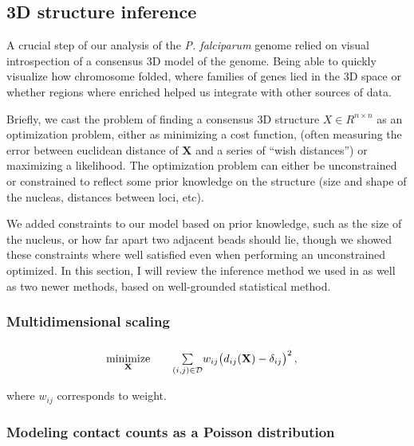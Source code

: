 \documentclass[oupdraft]{bio}
\begin{document}
\subsection{3D structure inference}

A crucial step of our analysis of the \textit{P. falciparum} genome relied on
visual introspection of a consensus 3D model of the genome. Being able to
quickly visualize how chromosome folded, where families of genes lied in the
3D space or whether regions where enriched helped us integrate with other
sources of data.

Briefly, we cast the problem of finding a consensus 3D structure $X \in R^{n
\times n}$ as an optimization problem, either as minimizing a cost function,
(often measuring the error between euclidean distance of $\mathbf{X}$ and a
series of ``wish distances'') or maximizing a likelihood. The optimization
problem can either be unconstrained or constrained to reflect some prior
knowledge on the structure (size and shape of the nucleas, distances between
loci, etc).

We added constraints to our model based on prior knowledge, such as the size
of the nucleus, or how far apart two adjacent beads should lie, though we
showed these constraints where well satisfied even when performing an
unconstrained optimized. In this section, I will review the inference method
we used in \citet{ay:three-dimensional} as well as two newer methods, based on
well-grounded statistical method.

\subsubsection{Multidimensional scaling}

\begin{equation}\label{eq:mds1} 
\renewcommand{\arraystretch}{2} 
\begin{array}{ccll} 
\underset{\mathbf{X}}{\text{minimize}} & & 
\underset{(i,j) \in \mathcal{D}}{\sum} w_{ij} \big(d_{ij}(\mathbf{X}) - \delta_{ij}\big)^2
\,,&\\ 
\end{array} 
\end{equation}

where $w_{ij}$ corresponds to weight.


\subsubsection{Modeling contact counts as a Poisson distribution}
\end{document}

